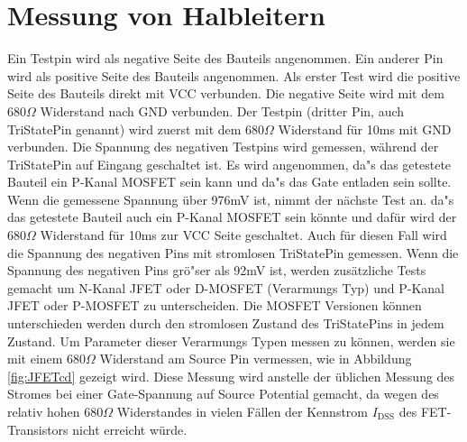 \section{Messung von Halbleitern}
Ein Testpin wird als negative Seite des Bauteils angenommen.
Ein anderer Pin wird als positive Seite des Bauteils angenommen.
Als erster Test wird die positive Seite des Bauteils direkt mit VCC verbunden.
Die negative Seite wird mit dem \(680\Omega\) Widerstand nach GND verbunden.
Der Testpin (dritter Pin, auch TriStatePin genannt) wird zuerst mit dem \(680\Omega\) Widerstand
f\"ur 10ms mit GND verbunden.
Die Spannung des negativen Testpins wird gemessen, w\"ahrend der TriStatePin auf Eingang
geschaltet ist.
Es wird angenommen, da"s das getestete Bauteil ein P-Kanal MOSFET sein kann und da"s das Gate
entladen sein sollte.
Wenn die gemessene Spannung \"uber 976mV ist, nimmt der n\"achste Test an. da"s das getestete
Bauteil auch ein P-Kanal MOSFET sein k\"onnte und daf\"ur wird der \(680\Omega\) Widerstand
f\"ur 10ms zur VCC Seite geschaltet.
Auch f\"ur diesen Fall wird die Spannung des negativen Pins mit stromlosen TriStatePin gemessen.
Wenn die Spannung des negativen Pins gr\"o"ser als 92mV ist, werden zus\"atzliche Tests gemacht
um N-Kanal JFET oder D-MOSFET (Verarmungs Typ) und P-Kanal JFET oder P-MOSFET zu unterscheiden.
Die MOSFET Versionen k\"onnen unterschieden werden durch den stromlosen Zustand des
TriStatePins in jedem Zustand.
Um Parameter dieser Verarmungs Typen messen zu k\"onnen, werden sie mit einem \(680 \Omega\) Widerstand am
Source Pin vermessen, wie in Abbildung \ref{fig:JFETcd} gezeigt wird. Diese Messung wird anstelle der
\"ublichen Messung des Stromes bei einer Gate-Spannung auf Source Potential gemacht, da wegen des
relativ hohen \(680 \Omega\) Widerstandes in vielen F\"allen der Kennstrom \(I_\mathrm{DSS}\) 
des FET-Transistors nicht erreicht w\"urde.

